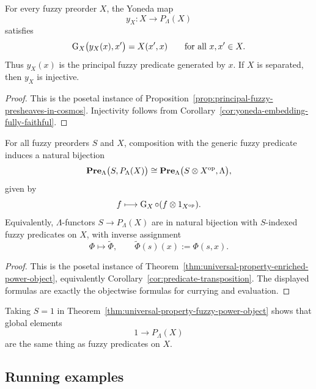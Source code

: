 \begin{proposition}
\label{prop:principal-fuzzy-predicates}
    For every fuzzy preorder \(X\), the Yoneda map
    \[
        y_X:X\to P_\Lambda(X)
    \]
    satisfies
    \[
        \operatorname{G}_X\bigl(y_X(x),x'\bigr)=X(x',x)
        \qquad
        \text{for all }x,x'\in X.
    \]
    Thus \(y_X(x)\) is the principal fuzzy predicate generated by \(x\). If \(X\) is separated, then \(y_X\) is injective.
\end{proposition}

\begin{proof}
    This is the posetal instance of Proposition~\ref{prop:principal-fuzzy-presheaves-in-cosmos}. Injectivity follows from Corollary~\ref{cor:yoneda-embedding-fully-faithful}.
\end{proof}

\begin{theorem}
\label{thm:universal-property-fuzzy-power-object}
    For all fuzzy preorders \(S\) and \(X\), composition with the generic fuzzy predicate induces a natural bijection
    \[
        \mathbf{Pre}_\Lambda\bigl(S,P_\Lambda(X)\bigr)
        \cong
        \mathbf{Pre}_\Lambda\bigl(S\otimes X^{\mathrm{op}},\Lambda\bigr),
    \]
    given by
    \[
        f\longmapsto \operatorname{G}_X\circ (f\otimes 1_{X^{\mathrm{op}}}).
    \]
    Equivalently, \(\Lambda\)-functors \(S\to P_\Lambda(X)\) are in natural bijection with \(S\)-indexed fuzzy predicates on \(X\), with inverse assignment
    \[
        \Phi\longmapsto \widetilde{\Phi},
        \qquad
        \widetilde{\Phi}(s)(x):=\Phi(s,x).
    \]
\end{theorem}

\begin{proof}
    This is the posetal instance of Theorem~\ref{thm:universal-property-enriched-power-object}, equivalently Corollary~\ref{cor:predicate-transposition}. The displayed formulas are exactly the objectwise formulas for currying and evaluation.
\end{proof}

\begin{remark}
\label{rem:global-elements-of-fuzzy-power-object}
    Taking \(S=1\) in Theorem~\ref{thm:universal-property-fuzzy-power-object} shows that global elements
    \[
        1\to P_\Lambda(X)
    \]
    are the same thing as fuzzy predicates on \(X\).
\end{remark}

\subsection{Running examples}
\label{subsec:running-examples-fuzzy-power-object}

